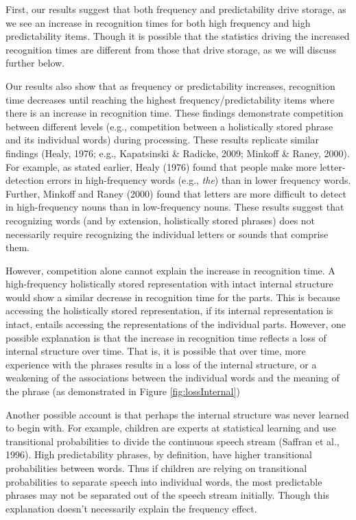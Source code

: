 \documentclass[
  man,floatsintext]{apa6}
\begin{document}
First, our results suggest that both frequency and predictability drive storage, as we see an increase in recognition times for both high frequency and high predictability items. Though it is possible that the statistics driving the increased recognition times are different from those that drive storage, as we will discuss further below.

Our results also show that as frequency or predictability increases, recognition time decreases until reaching the highest frequency/predictability items where there is an increase in recognition time. These findings demonstrate competition between different levels (e.g., competition between a holistically stored phrase and its individual words) during processing. These results replicate similar findings (Healy, 1976; e.g., Kapatsinski \& Radicke, 2009; Minkoff \& Raney, 2000). For example, as stated earlier, Healy (1976) found that people make more letter-detection errors in high-frequency words (e.g., \emph{the}) than in lower frequency words. Further, Minkoff and Raney (2000) found that letters are more difficult to detect in high-frequency nouns than in low-frequency nouns. These results suggest that recognizing words (and by extension, holistically stored phrases) does not necessarily require recognizing the individual letters or sounds that comprise them.

However, competition alone cannot explain the increase in recognition time. A high-frequency holistically stored representation with intact internal structure would show a similar decrease in recognition time for the parts. This is because accessing the holistically stored representation, if its internal representation is intact, entails accessing the representations of the individual parts. However, one possible explanation is that the increase in recognition time reflects a loss of internal structure over time. That is, it is possible that over time, more experience with the phrases results in a loss of the internal structure, or a weakening of the associations between the individual words and the meaning of the phrase (as demonstrated in Figure \ref{fig:lossInternal})

Another possible account is that perhaps the internal structure was never learned to begin with. For example, children are experts at statistical learning and use transitional probabilities to divide the continuous speech stream (Saffran et al., 1996). High predictability phrases, by definition, have higher transitional probabilities between words. Thus if children are relying on transitional probabilities to separate speech into individual words, the most predictable phrases may not be separated out of the speech stream initially. Though this explanation doesn't necessarily explain the frequency effect.
\end{document}
